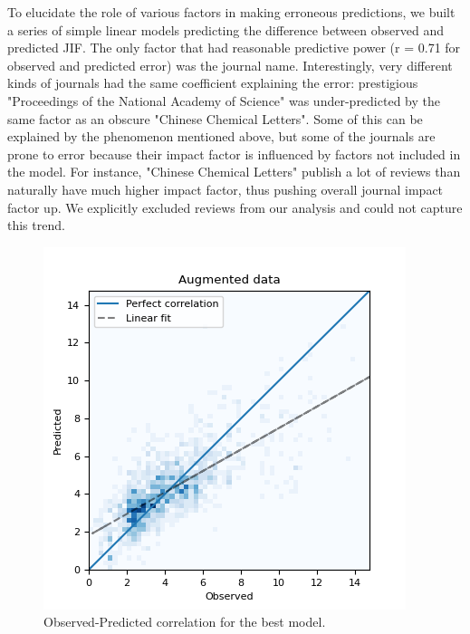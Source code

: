 \documentclass[11pt]{article}
\begin{document}
To elucidate the role of various factors in making erroneous predictions, we built a series of simple linear models predicting the difference between observed and predicted JIF. The only factor that had reasonable predictive power (r = 0.71 for observed and predicted error) was the journal name. Interestingly, very different kinds of journals had the same coefficient explaining the error: prestigious "Proceedings of the National Academy of Science" was under-predicted by the same factor as an obscure "Chinese Chemical Letters". Some of this can be explained by the phenomenon mentioned above, but some of the journals are prone to error because their impact factor is influenced by factors not included in the model. For instance, "Chinese Chemical Letters" publish a lot of reviews than naturally have much higher impact factor, thus pushing overall journal impact factor up. We explicitly excluded reviews from our analysis and could not capture this trend.

\begin{figure}
	\includegraphics[width= \columnwidth]{./Images/Best model.png}
	\caption{Observed-Predicted correlation for the best model.}
	\label{fig:best_model_corr}
\end{figure}
\end{document}
